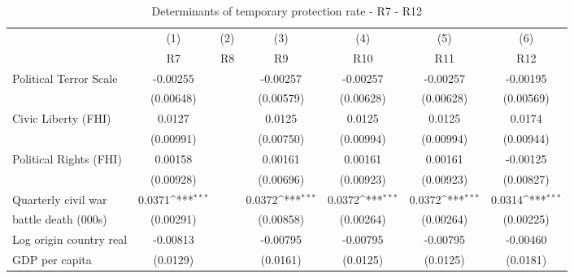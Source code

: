 \begin{table}[!ht]\centering \scriptsize
	\def\sym#1{\ifmmode^{#1}\else\(^{#1}\)\fi}
	\caption{Determinants of temporary protection rate - R7 - R12}
	\begin{tabular}{l*{6}{c}}
		\hline\hline
		&\multicolumn{1}{c}{(1)}     &\multicolumn{1}{c}{(2)}       &\multicolumn{1}{c}{(3)}       &\multicolumn{1}{c}{(4)}    	&\multicolumn{1}{c}{(5)}  	&\multicolumn{1}{c}{(6)}   \\
		&\multicolumn{1}{c}{R7}&\multicolumn{1}{c}{R8}&\multicolumn{1}{c}{R9}&\multicolumn{1}{c}{R10}&\multicolumn{1}{c}{R11}&\multicolumn{1}{c}{R12}\\ 

\hline
Political Terror Scale&    -0.00255         &                     &    -0.00257         &    -0.00257         &    -0.00257         &    -0.00195         \\
                    &   (0.00648)         &                     &   (0.00579)         &   (0.00628)         &   (0.00628)         &   (0.00569)         \\
[0,5em]
Civic Liberty (FHI) &      0.0127         &                     &      0.0125         &      0.0125         &      0.0125         &      0.0174         \\
                    &   (0.00991)         &                     &   (0.00750)         &   (0.00994)         &   (0.00994)         &   (0.00944)         \\
[0,5em]
Political Rights (FHI)&     0.00158         &                     &     0.00161         &     0.00161         &     0.00161         &    -0.00125         \\
                    &   (0.00928)         &                     &   (0.00696)         &   (0.00923)         &   (0.00923)         &   (0.00827)         \\
[0,5em]
Quarterly civil war &      0.0371\sym{***}&                     &      0.0372\sym{***}&      0.0372\sym{***}&      0.0372\sym{***}&      0.0314\sym{***}\\
battle death (000s)                    &   (0.00291)         &                     &   (0.00858)         &   (0.00264)         &   (0.00264)         &   (0.00225)         \\
[0,5em]
Log origin country real &    -0.00813         &                     &    -0.00795         &    -0.00795         &    -0.00795         &    -0.00460         \\
GDP per capita                    &    (0.0129)         &                     &    (0.0161)         &    (0.0125)         &    (0.0125)         &    (0.0181)         \\

\end{tabular}
\end{table}

